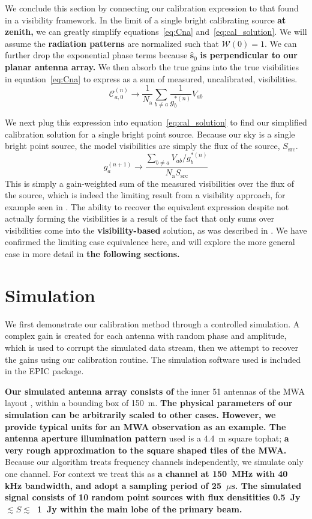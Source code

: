 \documentclass[a4paper,fleqn,usenatbib]{../mnras}
\newcommand{\Nant}{\ensuremath{N_{\mathrm{a}}}}
\newcommand{\spix}{\ensuremath{\hat{\mathbf{s}}_{0}}}
\begin{document}
We conclude this section by connecting our calibration expression to that found in a visibility 
framework. In the limit of a single bright calibrating source \textbf{at zenith,} we can greatly 
simplify equations~\ref{eq:Cna} and~\ref{eq:cal_solution}. We will assume the \textbf{radiation patterns} are 
normalized such that $\mathcal{W}(0)=1$. We can further drop the exponential phase terms 
because $\spix$ \textbf{is perpendicular to our planar antenna array.} We then absorb the true gains into the true visibilities in 
equation~\ref{eq:Cna} to express as a sum of measured, uncalibrated, visibilities.
\begin{equation}
\mathcal{C}^{(n)}_{a,0} \rightarrow \frac{1}{\Nant}\sum_{b\ne a} \frac{1}{g^{*(n)}_b} V_{ab}
\end{equation}

We next plug this expression into equation~\ref{eq:cal_solution} to find our simplified 
calibration solution for a single bright point source. Because our sky is a single bright point 
source, the model visibilities are simply the flux of the source, $S_{\mathrm{src}}$.
\begin{equation}
g^{(n+1)}_a \rightarrow \frac{\sum_{b\ne a}  V_{ab}/g^{*(n)}_b}{\Nant S_{\mathrm{src}}}
\end{equation}
This is simply a gain-weighted sum of the measured visibilities over the flux of the source, 
which is indeed the limiting result from a visibility approach, for example seen in \citealt{mit08}. 
The ability to recover the equivalent expression despite not actually forming the visibilities is a 
result of the fact that only sums over visibilities come into the \textbf{visibility-based} solution, as was described in 
\citealt{mor11}. We have confirmed the limiting case equivalence here, and will explore the 
more general case in more detail in \textbf{the following sections.}

\section{Simulation}\label{sec:sim}
We first demonstrate our calibration method through a controlled simulation. A complex gain is 
created for each antenna with random phase and amplitude, which is used to corrupt the 
simulated data stream, then we attempt to recover the gains using our calibration routine. The 
simulation software used is included in the EPIC package.

\textbf{Our simulated antenna 
array consists of} the inner 51 antennas of the MWA layout \citep{bea12}, within a bounding 
box of 150~m. 
\textbf{The physical parameters of our simulation can be arbitrarily scaled to other cases. However, 
we provide typical units for an MWA observation as an example. 
The antenna aperture illumination pattern} used is a 4.4~m square tophat; \textbf{a very rough 
approximation to the square shaped tiles of the MWA.} Because our algorithm treats frequency 
channels independently, we simulate only one channel. For context we treat this as \textbf{a channel
at 150~MHz with 40 kHz bandwidth, and adopt a sampling period of 25~$\mu$s. The simulated signal 
consists of 10 random point sources with flux densitities 0.5~Jy~$\lesssim S \lesssim$~1~Jy 
within the main lobe of the primary beam.}
\end{document}
